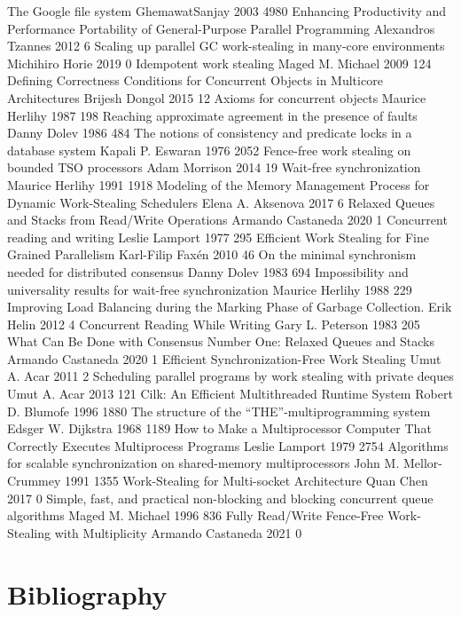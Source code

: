 \documentclass[openany, a4paper]{book}
\theoremstyle{break}
\theoremstyle{example}
\theoremstyle{note}
\theoremstyle{break}
\theoremstyle{exercise}
\begin{document}
The Google file system	GhemawatSanjay	2003	4980
Enhancing Productivity and Performance Portability of General-Purpose Parallel Programming	Alexandros Tzannes	2012	6
Scaling up parallel GC work-stealing in many-core environments	Michihiro Horie	2019	0
Idempotent work stealing	Maged M. Michael	2009	124
Defining Correctness Conditions for Concurrent Objects in Multicore Architectures	Brijesh Dongol	2015	12
Axioms for concurrent objects	Maurice Herlihy	1987	198
Reaching approximate agreement in the presence of faults	Danny Dolev	1986	484
The notions of consistency and predicate locks in a database system	Kapali P. Eswaran	1976	2052
Fence-free work stealing on bounded TSO processors	Adam Morrison	2014	19
Wait-free synchronization	Maurice Herlihy	1991	1918
Modeling of the Memory Management Process for Dynamic Work-Stealing Schedulers	Elena A. Aksenova	2017	6
Relaxed Queues and Stacks from Read/Write Operations	Armando Castaneda	2020	1
Concurrent reading and writing	Leslie Lamport	1977	295
Efficient Work Stealing for Fine Grained Parallelism	Karl-Filip Faxén	2010	46
On the minimal synchronism needed for distributed consensus	Danny Dolev	1983	694
Impossibility and universality results for wait-free synchronization	Maurice Herlihy	1988	229
Improving Load Balancing during the Marking Phase of Garbage Collection.	Erik Helin	2012	4
Concurrent Reading While Writing	Gary L. Peterson	1983	205
What Can Be Done with Consensus Number One: Relaxed Queues and Stacks	Armando Castaneda	2020	1
Efficient Synchronization-Free Work Stealing	Umut A. Acar	2011	2
Scheduling parallel programs by work stealing with private deques	Umut A. Acar	2013	121
Cilk: An Efficient Multithreaded Runtime System	Robert D. Blumofe	1996	1880
The structure of the “THE”-multiprogramming system	Edsger W. Dijkstra	1968	1189
How to Make a Multiprocessor Computer That Correctly Executes Multiprocess Programs	Leslie Lamport	1979	2754
Algorithms for scalable synchronization on shared-memory multiprocessors	John M. Mellor-Crummey	1991	1355
Work-Stealing for Multi-socket Architecture	Quan Chen	2017	0
Simple, fast, and practical non-blocking and blocking concurrent queue algorithms	Maged M. Michael	1996	836
Fully Read/Write Fence-Free Work-Stealing with Multiplicity	Armando Castaneda	2021	0

\part{Bibliography}
\label{sec:orgad15adb}


\end{document}
